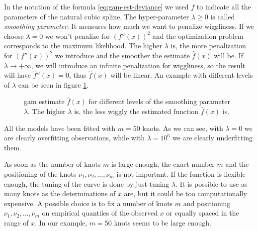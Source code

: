 \documentclass[a4paper, twoside, openright, 12pt]{report}
\theoremstyle{definition}
\theoremstyle{definition}
\theoremstyle{definition}
\theoremstyle{remark}
\begin{document}
In the notation of the formula \eqref{eq:gam-est-deviance} we used \(f\) to indicate all the parameters of the natural cubic spline. The hyper-parameter \(\lambda\ge0\) is called \emph{smoothing parameter}. It measures how much we want to penalize wiggliness. If we choose \(\lambda=0\) we won't penalize for \(\left( f''(x) \right)^2\) and the optimization problem corresponds to the maximum likelihood. The higher \(\lambda\) is, the more penalization for \(\left( f''(x) \right)^2\) we introduce and the smoother the estimate \(\hat{f}(x)\) will be. If \(\lambda\to+\infty\), we will introduce an infinite penalization for wiggliness, so the result will have \(\hat{f}''(x)=0\), thus \(\hat{f}(x)\) will be linear. An example with different levels of \(\lambda\) can be seen in figure \ref{fig:gam-lambda}.







\begin{figure}[!hbtp]

{\centering {}\newline{}

}

\caption[\ac{gam} estimate \(\hat{f}(x)\) for different levels of the smoothing parameter \(\lambda\).]{\ac{gam} estimate \(\hat{f}(x)\) for different levels of the smoothing parameter \(\lambda\). The higher \(\lambda\) is, the less wiggly the estimated function \(\hat{f}(x)\) is.}\label{fig:gam-lambda}
\end{figure}

All the models have been fitted with \(m = 50\) knots. As we can see, with \(\lambda = 0\) we are clearly overfitting observations, while with \(\lambda = 10^6\) we are clearly underfitting them.

As soon as the number of knots \(m\) is large enough, the exact number \(m\) and the positioning of the knots \(\nu_1, \nu_2, \dots, \nu_m\) is not important. If the function is flexible enough, the tuning of the curve is done by just tuning \(\lambda\). It is possible to use as many knots as the determinations of \(x\) are, but it could be too computationally expensive. A possible choice is to fix a number of knots \(m\) and positioning \(\nu_1, \nu_2, \dots, \nu_m\) on empirical quantiles of the observed \(x\) or equally spaced in the range of \(x\). In our example, \(m=50\) knots seems to be large enough.
\end{document}
